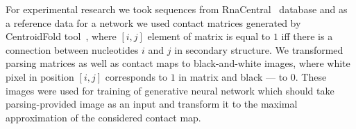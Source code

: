 \documentclass[12pt]{article}  %
\theoremstyle{definition}
\theoremstyle{remark}
\begin{document}
For experimental research we took sequences from RnaCentral~\cite{rnacentral} database and as a reference data for a network we used contact matrices generated by CentroidFold tool~\cite{hamada2009prediction}, where $[i,j]$ element of matrix is equal to $1$ iff there is a connection between nucleotides $i$ and $j$ in secondary structure. We transformed parsing matrices as well as contact maps to black-and-white images, where white pixel in position $[i,j]$ corresponds to $1$ in matrix and black --- to $0$. These images were used for training of generative neural network which should take parsing-provided image as an input and transform it to the maximal approximation of the considered contact map. 

 

\end{document}
